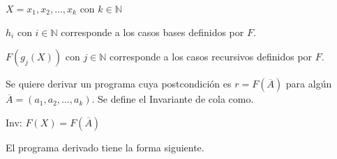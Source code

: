 \documentclass[hidelinks]{article}
\begin{document}
$X = x_1,x_2,\dots,x_k$ con $k \in \mathbb{N}$\par
$h_i$ con $i \in \mathbb{N}$ corresponde a los casos bases definidos por $F$.\par
$F(g_j(X))$ con $j \in \mathbb{N}$ corresponde a los casos recursivos definidos por $F$.

Se quiere derivar un programa cuya postcondición es $r = F(\overline{A})$ para
algún $\overline{A} = (a_1,a_2, \dots, a_k)$. Se define el Invariante de cola
como.

\begin{center}
	Inv: $F(X) = F(\overline{A})$
\end{center}\par

El programa derivado tiene la forma siguiente.\par
\end{document}
